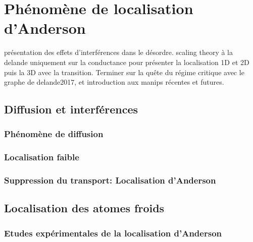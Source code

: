 \chapter{Phénomène de localisation d'Anderson} %

présentation des effets d'interférences dans le désordre. scaling theory à la delande uniquement sur la conductance pour présenter la localisation 1D et 2D puis la 3D avec la transition. Terminer sur la quête du régime critique avec le graphe de delande2017, et introduction aux manips récentes et futures.

\section{Diffusion et interférences}
\subsection{Phénomène de diffusion}
\lipsum[1]
\subsection{Localisation faible}
\lipsum[2]
\subsection{Suppression du transport: Localisation d'Anderson}
\lipsum[3]

\section{Localisation des atomes froids}
\subsection{Etudes expérimentales de la localisation d'Anderson}
\lipsum[4]
